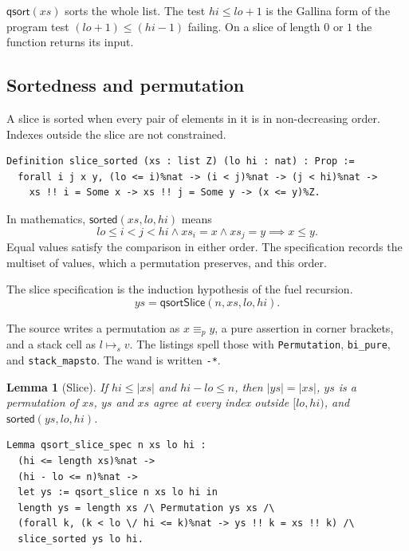 \documentclass[11pt]{article}
\newtheorem{lemma}[theorem]{Lemma}
\begin{document}
\(\mathsf{qsort}(xs)\) sorts the whole list.
The test \(\mathit{hi} \le lo + 1\) is the Gallina form of the program test \((lo + 1) \le (hi - 1)\) failing.
On a slice of length \(0\) or \(1\) the function returns its input.

\subsection{Sortedness and permutation}

A slice is sorted when every pair of elements in it is in non-decreasing order.
Indexes outside the slice are not constrained.

\begin{lstlisting}
Definition slice_sorted (xs : list Z) (lo hi : nat) : Prop :=
  forall i j x y, (lo <= i)%nat -> (i < j)%nat -> (j < hi)%nat ->
    xs !! i = Some x -> xs !! j = Some y -> (x <= y)%Z.
\end{lstlisting}

In mathematics, \(\mathsf{sorted}(xs, lo, hi)\) means
\[
lo \le i < j < hi \land xs_i = x \land xs_j = y \implies x \le y.
\]
Equal values satisfy the comparison in either order.
The specification records the multiset of values, which a permutation preserves, and this order.

The slice specification is the induction hypothesis of the fuel recursion.
\[
ys = \mathsf{qsortSlice}(n, xs, lo, hi).
\]

The source writes a permutation as \(x \equiv_p y\), a pure assertion in corner brackets, and a stack cell as \(l \mapsto_s v\).
The listings spell those with \texttt{Permutation}, \texttt{bi\_pure}, and \texttt{stack\_mapsto}.
The wand is written \texttt{-*}.

\begin{lemma}[Slice]
If \(hi \le \lvert xs \rvert\) and \(hi - lo \le n\), then \(\lvert ys \rvert = \lvert xs \rvert\), \(ys\) is a permutation of \(xs\), \(ys\) and \(xs\) agree at every index outside \([lo, hi)\), and \(\mathsf{sorted}(ys, lo, hi)\).
\end{lemma}

\begin{lstlisting}
Lemma qsort_slice_spec n xs lo hi :
  (hi <= length xs)%nat ->
  (hi - lo <= n)%nat ->
  let ys := qsort_slice n xs lo hi in
  length ys = length xs /\ Permutation ys xs /\
  (forall k, (k < lo \/ hi <= k)%nat -> ys !! k = xs !! k) /\
  slice_sorted ys lo hi.
\end{lstlisting}
\end{document}
